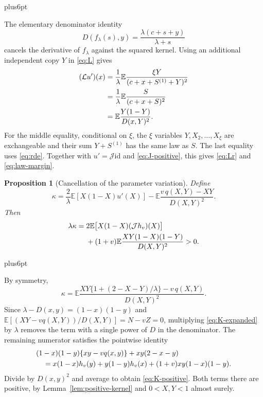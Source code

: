 \documentclass[11pt,reqno]{amsart}
\makeatletter
\theoremstyle{plain}
\newtheorem{proposition}[theorem]{Proposition}
\theoremstyle{definition}
\theoremstyle{remark}
\renewenvironment{proof}[1][\proofname]{%
  \par
  \pushQED{\qed}%
  \normalfont
  \topsep6pt plus6pt\relax
  \trivlist
  \item[\hskip\labelsep\slshape #1\@addpunct{.}]%
  \ignorespaces
}{%
  \popQED
  \endtrivlist
  \@endpefalse
}
\DeclareRobustCommand{\qed}{%
  \leavevmode\unskip\penalty9999\hbox{}\nobreak
  \ifmmode
    \makebox[0pt][l]{\qquad\hbox{\qedsymbol}}%
  \else
    \qquad\hbox{\qedsymbol}%
  \fi
}
\renewcommand{\qedsymbol}{\rule[.47pt]{4pt}{6pt}}
\numberwithin{equation}{section}
\newcommand{\E}{\mathbb E}
\newcommand{\cJ}{\mathcal J}
\newcommand{\cL}{\mathcal L}
\makeatother
\begin{document}
\begin{proof}
The elementary denominator identity
\begin{equation}\label{eq:denom-F}
 D(f_\lambda(s),y)
 =\frac{\lambda(c+s+y)}{\lambda+s}
\end{equation}
cancels the derivative of $f_\lambda$ against the squared kernel. Using an
additional independent copy $Y$ in \eqref{eq:L} gives
\begin{align}
 (\cL u')(x)
 &=\frac1\lambda\E\frac{\xi Y}{(c+x+S^{(1)}+Y)^2}\notag\\
 &=\frac1\lambda\E\frac{S}{(c+x+S)^2}\notag\\
 &=\E\frac{Y(1-Y)}{D(x,Y)^2}.\label{eq:Lr-proof}
\end{align}
For the middle equality, conditional on $\xi$, the $\xi$ variables
$Y,X_2,\ldots,X_\xi$ are exchangeable and their sum $Y+S^{(1)}$ has the
same law as $S$. The last equality uses \eqref{eq:rde}. Together with
$u'=\cJ\mathrm{id}$ and \eqref{eq:J-positive}, this gives
\eqref{eq:Lr} and \eqref{eq:law-margin}.
\end{proof}

\begin{proposition}[Cancellation of the parameter variation]\label{prop:cancel-parameter}
Define
\begin{equation}\label{eq:K}
 \kappa=\frac2\lambda\E[X(1-X)u'(X)]
        -\E\frac{v\,q(X,Y)-XY}{D(X,Y)^2}.
\end{equation}
Then
\begin{align}
 \lambda \kappa
 ={}&2\E\bigl[X(1-X)(\cJ h_v)(X)\bigr]\notag\\
 &+(1+v)\E\frac{XY(1-X)(1-Y)}{D(X,Y)^2}>0.
 \label{eq:K-positive}
\end{align}
\end{proposition}

\begin{proof}
By symmetry,
\begin{equation}\label{eq:K-expanded}
 \kappa=\E\frac{XY\{1+(2-X-Y)/\lambda\}-v\,q(X,Y)}{D(X,Y)^2}.
\end{equation}
Since $\lambda-D(x,y)=(1-x)(1-y)$ and
$\E[(XY-vq(X,Y))/D(X,Y)]=N-vZ=0$, multiplying
\eqref{eq:K-expanded} by $\lambda$ removes the term with a single power
of $D$ in the denominator. The remaining numerator satisfies the pointwise
identity
\begin{align}
 &(1-x)(1-y)\{xy-vq(x,y)\}+xy(2-x-y)\notag\\
 &\quad=x(1-x)h_v(y)+y(1-y)h_v(x)
             +(1+v)xy(1-x)(1-y).\label{eq:pointwise-K}
\end{align}
Divide by $D(x,y)^2$ and average to obtain \eqref{eq:K-positive}.
Both terms there are positive, by Lemma~\ref{lem:positive-kernel} and
$0<X,Y<1$ almost surely.
\end{proof}
\end{document}
